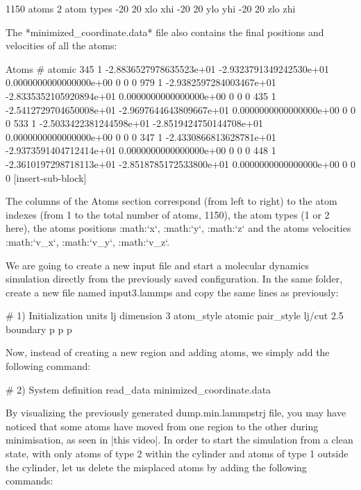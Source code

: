 \begin{lcverbatim}
1150 atoms
2 atom types
-20 20 xlo xhi
-20 20 ylo yhi
-20 20 zlo zhi
\end{lcverbatim}

The *minimized_coordinate.data* file also contains the final
positions and velocities of all the atoms:



\begin{lcverbatim}
Atoms # atomic
345 1 -2.8836527978635523e+01 -2.9323791349242530e+01 0.0000000000000000e+00 0 0 0
979 1 -2.9382597284003467e+01 -2.8335352105920894e+01 0.0000000000000000e+00 0 0 0
435 1 -2.5412729704650008e+01 -2.9697644643809667e+01 0.0000000000000000e+00 0 0 0
533 1 -2.5033422381244598e+01 -2.8519424750144708e+01 0.0000000000000000e+00 0 0 0
347 1 -2.4330866813628781e+01 -2.9373591404712414e+01 0.0000000000000000e+00 0 0 0
448 1 -2.3610197298718113e+01 -2.8518785172533800e+01 0.0000000000000000e+00 0 0 0
[insert-sub-block]
\end{lcverbatim}

The columns of the Atoms section
correspond (from left to right) to the atom indexes (from 1
to the total number of atoms, 1150), the atom types (1 or 2
here), the atoms positions :math:`x`, :math:`y`, :math:`z` and the
atoms velocities :math:`v_x`, :math:`v_y`, :math:`v_z`.






We are going to create a new input file and start a
molecular dynamics simulation directly from the previously
saved configuration. In the same folder, create a new file
named input3.lammps and copy the same lines as previously:



\begin{lcverbatim}
# 1) Initialization
units lj
dimension 3
atom_style atomic
pair_style lj/cut 2.5
boundary p p p
\end{lcverbatim}

Now, instead of creating a new region and adding atoms, we
simply add the following command:



\begin{lcverbatim}
# 2) System definition
read_data minimized_coordinate.data
\end{lcverbatim}

By visualizing the previously generated dump.min.lammpstrj
file, you may have noticed that some atoms have moved from
one region to the other during minimisation, as seen in
|this video|.
In order to start the simulation from a clean state, with
only atoms of type 2 within the cylinder and atoms of type
1 outside the cylinder, let us delete the misplaced atoms
by adding the following commands:





